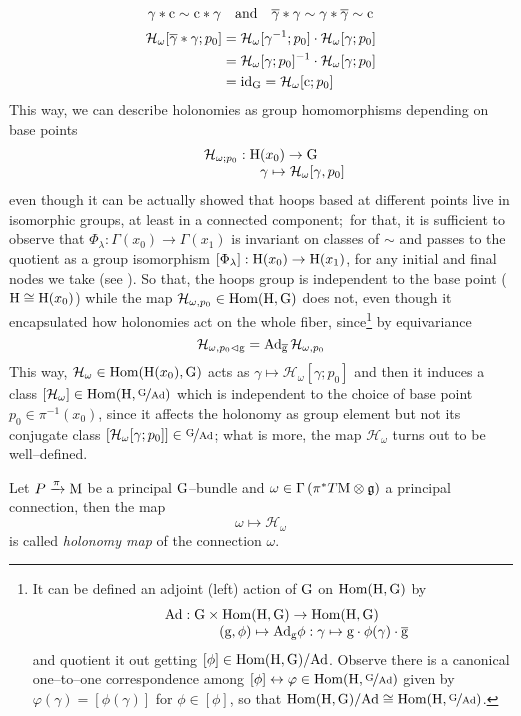 $$\gamma*\c\sim\c*\gamma\quad\text{and}\quad\overline{\gamma}*\gamma\sim\gamma*\overline{\gamma}\sim\c$$
\begin{align*}
    \mathcal{H}_\omega[\overline{\gamma}*\gamma;p_0]&=\mathcal{H}_\omega[\gamma^{-1};p_0]\cdot\mathcal{H}_\omega[\gamma;p_0]\\
    &=\mathcal{H}_\omega[\gamma;p_0]^{-1}\cdot\mathcal{H}_\omega[\gamma;p_0]\\
    &=\text{\normalfont id}_{\text{\normalfont G}}=\mathcal{H}_\omega[\text{\normalfont c};p_0]
\end{align*}
This way, we can describe holonomies as group homomorphisms depending on base points
$$\begin{matrix}
    \mathcal{H}_{\omega;p_0}:\H(x_0)\to\G\\
    \qquad\qquad\qquad \gamma\mapsto\mathcal{H}_\omega[\gamma,p_0]
\end{matrix}$$
even though it can be actually showed that hoops based at different points live in isomorphic groups, at least in a connected component;\, for that, it is sufficient to observe that $\Phi_\lambda:\Gamma(x_0)\to\Gamma(x_1)$ is invariant on classes of $\sim$ and passes to the quotient as a group isomorphism $[\Phi_\lambda]:\H(x_0)\to\H(x_1)$, for any initial and final nodes we take (see \cite{LN5}). So that, the hoops group is independent to the base point ($\H\cong\H(x_0)$) while the map $\mathcal{H}_{\omega,p_0}\in\Hom(\H,\G)$ does not, even though it encapsulated how holonomies act on the whole fiber, since\footnote{It can be defined an adjoint (left) action of $\G$ on $\Hom(\H,\G)$ by
$$\begin{matrix}
    \Ad:\G\times\Hom(\H,\G)\to\Hom(\H,\G)\\
    \qquad\qquad\qquad (\g,\phi)\mapsto
        \Ad_\g\phi:\gamma\mapsto\g\cdot\phi(\gamma)\cdot\overline{\g}
        
\end{matrix}$$
and quotient it out getting $[\phi]\in\Hom(\H,\G)/\Ad$. Observe there is a canonical one--to--one correspondence among $[\phi]\leftrightarrow\varphi\in\Hom(\H,\nicefrac{\G}{\Ad})$ given by $\varphi(\gamma)=[\phi(\gamma)]$ for $\phi\in[\phi]$, so that $\Hom(\H,\G)/\Ad\cong\Hom(\H,\nicefrac{\G}{\Ad})$.
} by equivariance
$$\mathcal{H}_{\omega,p_0\vartriangleleft\g}=\Ad_{\overline{\g}}\,\mathcal{H}_{\omega,p_0}$$
This way, $\mathcal{H}_\omega\in\Hom(\H(x_0),\G)$ acts as $\gamma\mapsto\mathcal{H}_\omega[\gamma;p_0]$ and then it induces a class $[\mathcal{H}_\omega]\in\Hom(\H,\nicefrac{\G}{\Ad})$ which is independent to the choice of base point $p_0\in\pi^{-1}(x_0)$, since it affects the holonomy as group element but not its conjugate class $[\mathcal{H}_\omega[\gamma;p_0]]\in\nicefrac{\G}{\Ad}$; what is more, the map $\mathcal{H}_\omega$ turns out to be well--defined.
\begin{defi}
    Let $P\xrightarrow{\pi}\M$ be a principal $\G$--bundle and $\omega\in\Sec{\pi^*T\M\otimes\mathfrak{g}}$ a principal connection, then the map
    $$\omega\mapsto\mathcal{H}_\omega$$ 
    is called \emph{holonomy map} of the connection $\omega$.
\end{defi}

